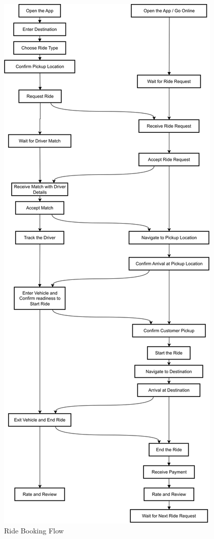 \begin{figure}[h]
    \centering
    \includegraphics[width=0.95\linewidth, height=0.75\textheight, keepaspectratio]{data/ride-flow.svg}
    \caption{Ride Booking Flow}
    \label{fig:RideBookingFlow}
\end{figure}


